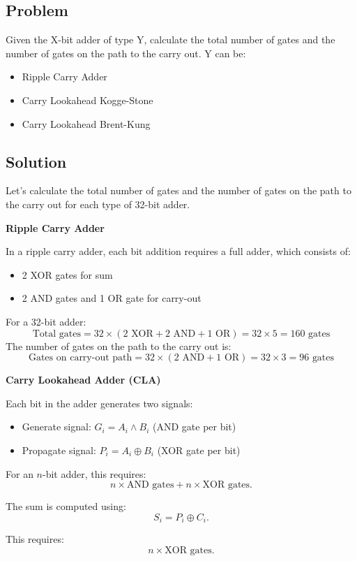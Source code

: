 \subsection*{Problem}
Given the X-bit adder of type Y, calculate the total number of gates and
the number of gates on the path to the carry out. Y can be:
\begin{itemize}
    \item Ripple Carry Adder
    \item Carry Lookahead Kogge-Stone
    \item Carry Lookahead Brent-Kung
\end{itemize}

\subsection*{Solution}
Let's calculate the total number of gates and the number of gates on the path to the carry out for each type of 32-bit adder.

\textbf{Ripple Carry Adder}

In a ripple carry adder, each bit addition requires a full adder, which consists of:
\begin{itemize}
    \item 2 XOR gates for sum
    \item 2 AND gates and 1 OR gate for carry-out
\end{itemize}
For a 32-bit adder:
\[
\text{Total gates} = 32 \times (2 \text{ XOR} + 2 \text{ AND} + 1 \text{ OR}) = 32 \times 5 = 160 \text{ gates}
\]
The number of gates on the path to the carry out is:
\[
\text{Gates on carry-out path} = 32 \times (2 \text{ AND} + 1 \text{ OR}) = 32 \times 3 = 96 \text{ gates}
\]

\textbf{Carry Lookahead Adder (CLA)}

Each bit in the adder generates two signals:
\begin{itemize}
    \item Generate signal: \( G_i = A_i \land B_i \) (AND gate per bit)
    \item Propagate signal: \( P_i = A_i \oplus B_i \) (XOR gate per bit)
\end{itemize}

For an \( n \)-bit adder, this requires:
\[
n \times \text{AND gates} + n \times \text{XOR gates}.
\]

The sum is computed using:
\[
S_i = P_i \oplus C_i.
\]

This requires:
\[
n \times \text{XOR gates}.
\]

